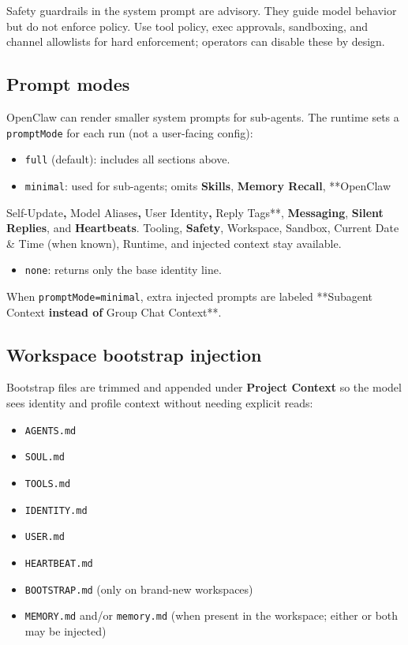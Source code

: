Safety guardrails in the system prompt are advisory. They guide model behavior but do not enforce policy. Use tool policy, exec approvals, sandboxing, and channel allowlists for hard enforcement; operators can disable these by design.

\subsection{Prompt modes}


OpenClaw can render smaller system prompts for sub-agents. The runtime sets a
\texttt{promptMode} for each run (not a user-facing config):

\begin{itemize}
  \item \texttt{full} (default): includes all sections above.
  \item \texttt{minimal}: used for sub-agents; omits \textbf{Skills}, \textbf{Memory Recall}, **OpenClaw
\end{itemize}

Self-Update\textbf{, }Model Aliases\textbf{, }User Identity\textbf{, }Reply Tags**,
\textbf{Messaging}, \textbf{Silent Replies}, and \textbf{Heartbeats}. Tooling, \textbf{Safety},
Workspace, Sandbox, Current Date \& Time (when known), Runtime, and injected
context stay available.
\begin{itemize}
  \item \texttt{none}: returns only the base identity line.
\end{itemize}


When \texttt{promptMode=minimal}, extra injected prompts are labeled **Subagent
Context\textbf{ instead of }Group Chat Context**.

\subsection{Workspace bootstrap injection}


Bootstrap files are trimmed and appended under \textbf{Project Context} so the model sees identity and profile context without needing explicit reads:

\begin{itemize}
  \item \texttt{AGENTS.md}
  \item \texttt{SOUL.md}
  \item \texttt{TOOLS.md}
  \item \texttt{IDENTITY.md}
  \item \texttt{USER.md}
  \item \texttt{HEARTBEAT.md}
  \item \texttt{BOOTSTRAP.md} (only on brand-new workspaces)
  \item \texttt{MEMORY.md} and/or \texttt{memory.md} (when present in the workspace; either or both may be injected)
\end{itemize}


